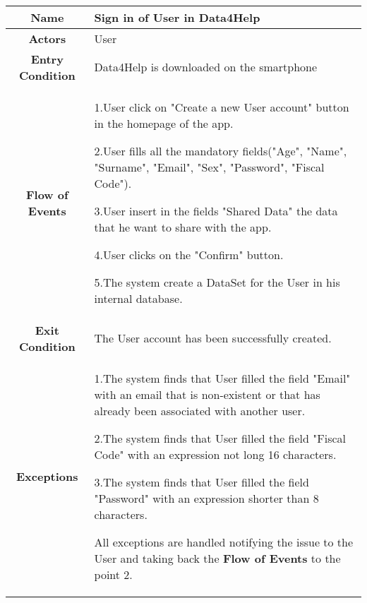 
\subsubsection{}
     \begin{table}[h!]
   \centering
    \begin{tabularx}{\linewidth}{|c|X|}
         \hline
         \textbf{Name} & Sign in of User in Data4Help\\
	\hline
	\textbf{Actors} & User \\
	\hline
	\textbf{Entry Condition} & Data4Help is downloaded on the smartphone \\
	\hline
	\textbf{Flow of Events} & 1.User click on "Create a new User account" button in the homepage of the app.

					2.User fills all the mandatory fields("Age", "Name", "Surname", "Email", "Sex", "Password", "Fiscal 							Code").

					3.User insert in the fields "Shared Data" the data that he want to share with the app.

					4.User clicks on the "Confirm" button.

					5.The system create a DataSet for the User in his internal database.\\
	\hline
	\textbf{Exit Condition} & The User account has been successfully created. \\
	\hline
	\textbf{Exceptions} & 
					1.The system finds that User filled the field "Email"  with an email that is non-existent or that has 							already been associated with another user.

					2.The system finds that User filled the field "Fiscal Code" with an expression not long 16 								characters.

					3.The system finds that User filled the field "Password" with an expression shorter than 8 								characters.

					All exceptions are handled notifying the issue to the User and taking back the \textbf{Flow of 							Events} to the point 2.\\
        \hline
      \end{tabularx}        
      \end{table}

